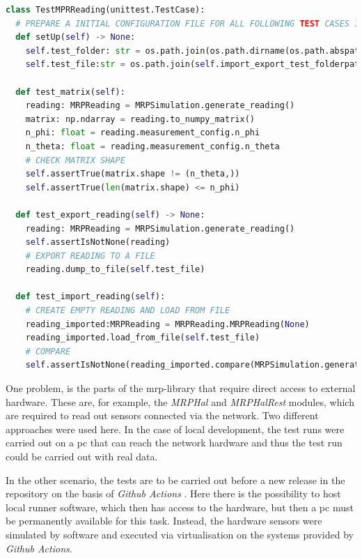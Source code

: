 \begin{lstlisting}[language=Python, caption={Example pytest class for testing MRPReading module functions}, label=lst:pytest_example_code]
class TestMPRReading(unittest.TestCase):
  # PREPARE A INITIAL CONFIGURATION FILE FOR ALL FOLLOWING TEST CASES IN THIS FILE
  def setUp(self) -> None:
    self.test_folder: str = os.path.join(os.path.dirname(os.path.abspath(__file__)), "tmp")
    self.test_file:str = os.path.join(self.import_export_test_folderpath, "tmp")

  def test_matrix(self):
    reading: MRPReading = MRPSimulation.generate_reading()
    matrix: np.ndarray = reading.to_numpy_matrix()
    n_phi: float = reading.measurement_config.n_phi
    n_theta: float = reading.measurement_config.n_theta
    # CHECK MATRIX SHAPE
    self.assertTrue(matrix.shape != (n_theta,))
    self.assertTrue(len(matrix.shape) <= n_phi)

  def test_export_reading(self) -> None:
    reading: MRPReading = MRPSimulation.generate_reading()
    self.assertIsNotNone(reading)
    # EXPORT READING TO A FILE
    reading.dump_to_file(self.test_file)

  def test_import_reading(self):
    # CREATE EMPTY READING AND LOAD FROM FILE
    reading_imported:MRPReading = MRPReading.MRPReading(None)
    reading_imported.load_from_file(self.test_file)
    # COMPARE
    self.assertIsNotNone(reading_imported.compare(MRPSimulation.generate_reading()))
\end{lstlisting}

One problem, is the parts of the \gls{mrp}-library that require direct
access to external hardware. These are, for example, the \emph{MRPHal}
and \emph{MRPHalRest} modules, which are required to read out sensors
connected via the network. Two different approaches were used here. In
the case of local development, the test runs were carried out on a
\gls{pc} that can reach the network hardware and thus the test run could
be carried out with real data.

\newpage

In the other scenario, the tests are to be carried out before a new
release in the repository on the basis of \emph{Github Actions}
\cite{GithubActions}. Here there is the possibility to host local
runner software, which then has access to the hardware, but then a
\gls{pc} must be permanently available for this task. Instead, the
hardware sensors were simulated by software and executed via
virtualisation on the systems provided by \emph{Github Actions}.

